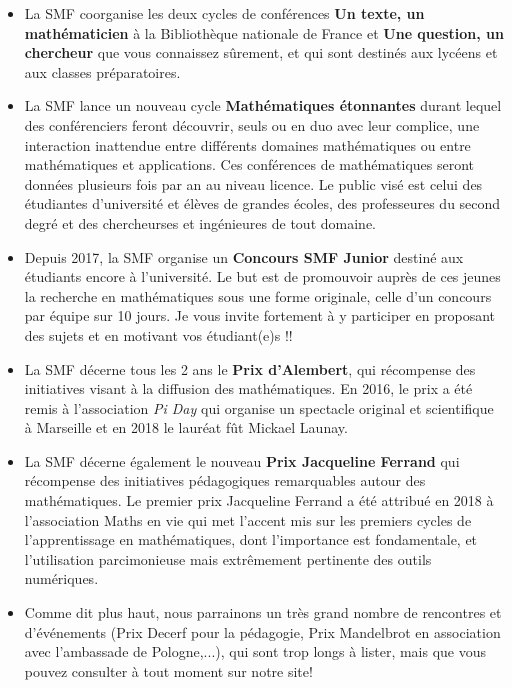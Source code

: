 \begin{itemize}
 \item
 La SMF coorganise les deux cycles de conf\'erences
{\bf Un texte, un math\'ematicien}   \`a la Biblioth\`{e}que nationale de France  et {\bf Une question, un chercheur} que vous connaissez s\^urement, et qui sont destin\'es aux lyc\'eens et aux classes pr\'eparatoires.
\item
La SMF lance un nouveau cycle {\bf Math\'ematiques \'etonnantes} durant lequel des conf\'erenciers feront d\'ecouvrir, seuls ou en duo avec leur complice, une interaction inattendue entre diff\'erents domaines math\'ematiques ou entre math\'ematiques et applications. Ces conf\'erences de math\'ematiques seront donn\'ees plusieurs fois par an au niveau licence. Le public vis\'e est celui des \'etudiant\mp es d'universit\'e et \'el\`eves de grandes \'ecoles, des professeur\mp es du second degr\'e et des chercheur\mp ses et ing\'enieur\mp es de tout domaine.

\item
Depuis 2017, la SMF organise un {\bf Concours SMF Junior} destin\'e aux \'etudiants encore \`a l'universit\'e. Le but est de promouvoir aupr\`es de ces jeunes la recherche en math\'ematiques sous une forme originale, celle d'un concours par \'equipe sur 10 jours. Je vous invite fortement \`a y participer en proposant des sujets et en motivant vos \'etudiant(e)s !!

\item
La SMF d\'ecerne tous les 2 ans le {\bf Prix d'Alembert}, qui r\'ecompense des initiatives visant \`a la diffusion des math\'ematiques. En 2016, le prix a \'et\'e remis \`a l'association {\em Pi Day} qui organise un spectacle original et scientifique \`a Marseille et en 2018 le laur\'eat f\^ut Mickael Launay.

\item 
La SMF d\'ecerne \'egalement le nouveau {\bf Prix Jacqueline Ferrand} qui r\'ecompense des initiatives p\'edagogiques remarquables autour des math\'ematiques. Le	premier prix Jacqueline Ferrand a \'et\'e attribu\'e en 2018 \`a l’association Maths en vie qui met l’accent mis sur les premiers cycles de l’apprentissage en math\'ematiques, dont l’importance est fondamentale, et l’utilisation parcimonieuse mais extr\^emement pertinente des outils num\'eriques. 

\item
Comme dit plus haut, nous parrainons un tr\`es grand nombre de rencontres et d'\'ev\'enements (Prix Decerf pour la p\'edagogie, Prix Mandelbrot en association avec l'ambassade de Pologne,...), qui sont trop longs \`a lister, mais que vous pouvez consulter \`a tout moment sur notre site!

\end{itemize}


